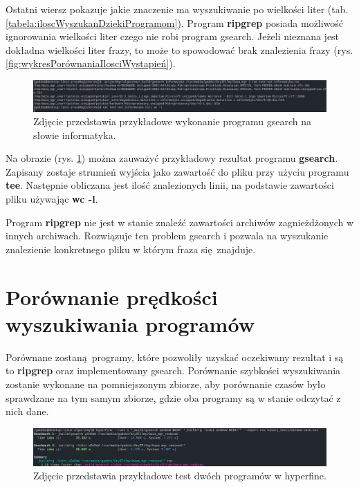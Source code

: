Ostatni wiersz pokazuje jakie znaczenie ma wyszukiwanie po wielkości liter 
(tab. \ref{tabela:iloscWyszukanDziekiProgramom}). Program \textbf{ripgrep} posiada 
możliwość ignorowania wielkości liter czego nie robi program gsearch. Jeżeli
nieznana jest dokładna wielkości liter frazy, to może to spowodować brak 
znalezienia frazy (rys. \ref{fig:wykresPorównaniaIlosciWystapień}). 

\begin{figure}[ht]
    \centering
    \includegraphics[width=\textwidth]{./images/gsearch-result-informatyka.png}
    \caption{Zdjęcie przedstawia przykładowe wykonanie programu gsearch na słowie informatyka.}
    \label{fig:wykonanieProgramuGsearch}
\end{figure}

Na obrazie (rys. \ref{fig:wykonanieProgramuGsearch}) można zauważyć przykładowy
rezultat programu \textbf{gsearch}. Zapisany zostaje strumień wyjścia jako zawartość do pliku
przy użyciu programu \textbf{tee}. Następnie obliczana jest ilość znalezionych linii,
na podstawie zawartości pliku używając \textbf{wc -l}.

Program \textbf{ripgrep} nie jest w stanie znaleźć zawartości archiwów zagnieżdżonych w
innych archiwach. Rozwiązuje ten problem gsearch i pozwala na wyszukanie 
znalezienie konkretnego pliku w którym fraza się znajduje.

\section{Porównanie prędkości wyszukiwania programów}

Porównane zostaną programy, które pozwoliły uzyskać oczekiwany rezultat i są to
\textbf{ripgrep} oraz implementowany gsearch. 
Porównanie szybkości wyszukiwania zostanie wykonane na pomniejszonym zbiorze,
aby porównanie czasów było sprawdzane na tym samym zbiorze, gdzie oba programy
są w stanie odczytać z nich dane.

\begin{figure}[h]
    \centering
    \includegraphics[width=\textwidth]{./images/example-hyperfine-run.png}
    \caption{Zdjęcie przedstawia przykładowe test dwóch programów w hyperfine.}
    \label{fig:hyperfineExample}
\end{figure}

